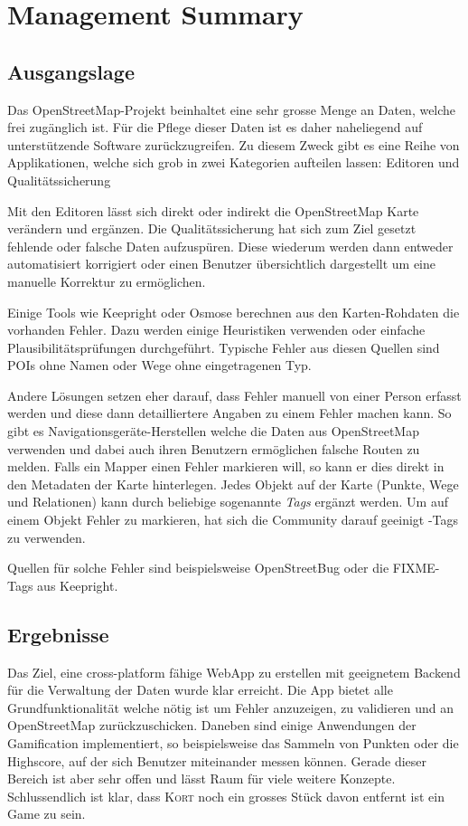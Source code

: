 \chapter*{Management Summary}
\thispagestyle{scrheadings}


\section*{Ausgangslage}
Das OpenStreetMap-Projekt beinhaltet eine sehr grosse Menge an Daten, welche frei zugänglich ist.
Für die Pflege dieser Daten ist es daher naheliegend auf unterstützende Software zurückzugreifen.
Zu diesem Zweck gibt es eine Reihe von Applikationen, welche sich grob in zwei Kategorien aufteilen lassen:
Editoren und Qualitätssicherung

Mit den Editoren lässt sich direkt oder indirekt die OpenStreetMap Karte verändern und ergänzen.
Die Qualitätssicherung hat sich zum Ziel gesetzt fehlende oder falsche Daten aufzuspüren.
Diese wiederum werden dann entweder automatisiert korrigiert oder einen Benutzer übersichtlich dargestellt um eine manuelle Korrektur zu ermöglichen.

Einige Tools wie Keepright oder Osmose berechnen aus den Karten-Rohdaten die vorhanden Fehler.
Dazu werden einige Heuristiken verwenden oder einfache Plausibilitätsprüfungen durchgeführt.
Typische Fehler aus diesen Quellen sind \gls{POI}s ohne Namen oder Wege ohne eingetragenen Typ.

Andere Lösungen setzen eher darauf, dass Fehler manuell von einer Person erfasst werden und diese dann detailliertere Angaben zu einem Fehler machen kann. 
So gibt es Navigationsgeräte-Herstellen welche die Daten aus OpenStreetMap verwenden und dabei auch ihren Benutzern ermöglichen falsche Routen zu melden. 
Falls ein \gls{Mapper} einen Fehler markieren will, so kann er dies direkt in den Metadaten der Karte hinterlegen. Jedes Objekt auf der Karte (Punkte, Wege und Relationen) kann durch beliebige sogenannte  \emph{Tags} ergänzt werden.
Um auf einem Objekt Fehler zu markieren, hat sich die Community darauf geeinigt -Tags zu verwenden.

Quellen für solche Fehler sind beispielsweise OpenStreetBug oder die FIXME-Tags aus Keepright.


\section*{Ergebnisse}
Das Ziel, eine cross-platform fähige \gls{WebApp} zu erstellen mit geeignetem Backend für die Verwaltung der Daten wurde klar erreicht.
Die App bietet alle Grundfunktionalität welche nötig ist um Fehler anzuzeigen, zu validieren und an OpenStreetMap zurückzuschicken.
Daneben sind einige Anwendungen der Gamification implementiert, so beispielsweise das Sammeln von Punkten oder die Highscore, auf der sich Benutzer miteinander messen können.
Gerade dieser Bereich ist aber sehr offen und lässt Raum für viele weitere Konzepte. Schlussendlich ist klar, dass \textsc{Kort} noch ein grosses Stück davon entfernt ist ein Game zu sein.

